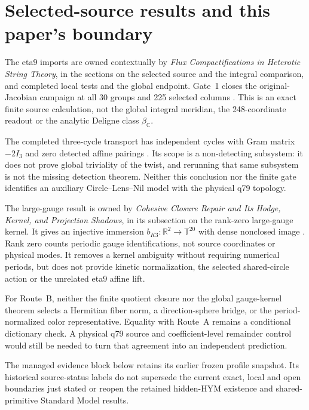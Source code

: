 \documentclass[11pt]{article}
\begin{document}
\section{Selected-source results and this paper's boundary}
\label{sec:theta-source-consumers}

The eta9 imports are owned contextually by \emph{Flux Compactifications in
Heterotic String Theory}, in the sections on the selected source and the
integral comparison, and completed local tests and the global endpoint.
Gate~1 closes the original-Jacobian campaign at all 30 groups and 225 selected
columns \cite{ThetaGate1}. This is an exact finite source calculation, not
the global integral meridian, the 248-coordinate readout or the analytic
Deligne class $\beta_{\mathbb C}$.

The completed three-cycle transport has independent cycles with Gram matrix
$-2I_3$ and zero detected affine pairings \cite{ThetaCycles}. Its scope is
a non-detecting subsystem: it does not prove global triviality of the twist,
and rerunning that same subsystem is not the missing detection theorem.
Neither this conclusion nor the finite gate identifies an auxiliary
Circle--Lens--Nil model with the physical q79 topology.

The large-gauge result is owned by \emph{Cohesive Closure Repair and Its
Hodge, Kernel, and Projection Shadows}, in its subsection on the rank-zero
large-gauge kernel. It gives an injective immersion
$b_{K3}:\mathbb R^2\to\mathbb T^{20}$ with dense nonclosed image
\cite{ThetaBK3}. Rank zero counts periodic gauge identifications, not source
coordinates or physical modes. It removes a kernel ambiguity without
requiring numerical periods, but does not provide kinetic normalization,
the selected shared-circle action or the unrelated eta9 affine lift.

For Route~B, neither the finite quotient closure nor the global gauge-kernel
theorem selects a Hermitian fiber norm, a direction-sphere bridge, or the
period-normalized color representative. Equality with Route~A remains a
conditional dictionary check. A physical q79 source and coefficient-level
remainder control would still be needed to turn that agreement into an
independent prediction.


The managed evidence block below retains its earlier frozen profile snapshot.
Its historical source-status labels do not supersede the current exact,
local and open boundaries just stated or reopen the retained hidden-HYM
existence and shared-primitive Standard Model results.
\end{document}
